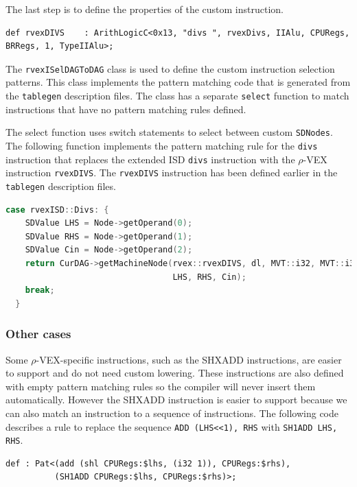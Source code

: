 The last step is to define the properties of the custom instruction.

\begin{lstlisting}[language=tblgen]
def rvexDIVS    : ArithLogicC<0x13, "divs ", rvexDivs, IIAlu, CPURegs, BRRegs, 1, TypeIIAlu>;
\end{lstlisting}

The \texttt{rvexISelDAGToDAG} class is used to define the custom instruction selection patterns. This class implements the pattern matching code that is generated from the \texttt{tablegen} description files. The class has a separate \texttt{select} function to match instructions that have no pattern matching rules defined.

The select function uses switch statements to select between custom \texttt{SDNodes}. The following function implements the pattern matching rule for the \texttt{divs} instruction that replaces the extended ISD \texttt{divs} instruction with the $\rho$-VEX instruction \texttt{rvexDIVS}. The \texttt{rvexDIVS} instruction has been defined earlier in the \texttt{tablegen} description files.

\begin{lstlisting}[language=C++]   
  case rvexISD::Divs: {
    SDValue LHS = Node->getOperand(0);
    SDValue RHS = Node->getOperand(1);
    SDValue Cin = Node->getOperand(2);
    return CurDAG->getMachineNode(rvex::rvexDIVS, dl, MVT::i32, MVT::i32,
                                  LHS, RHS, Cin);
    break;
  }
\end{lstlisting}

\subsubsection{Other cases}
Some $\rho$-VEX-specific instructions, such as the SHXADD instructions, are easier to support and do not need custom lowering. These instructions are also defined with empty pattern matching rules so the compiler will never insert them automatically. However the SHXADD instruction is easier to support because we can also match an instruction to a sequence of instructions. The following code describes a rule to replace the sequence \texttt{ADD (LHS\textless\textless1), RHS} with \texttt{SH1ADD LHS, RHS}.

\begin{lstlisting}[language=tblgen]
def : Pat<(add (shl CPURegs:$lhs, (i32 1)), CPURegs:$rhs),
          (SH1ADD CPURegs:$lhs, CPURegs:$rhs)>;
\end{lstlisting}


